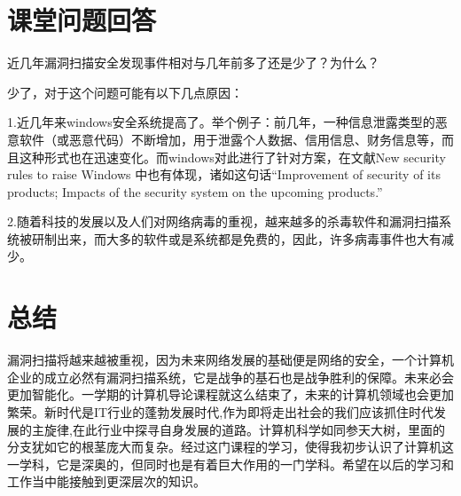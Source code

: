\documentclass{article}
\begin{document}
\section{课堂问题回答}
近几年漏洞扫描安全发现事件相对与几年前多了还是少了？为什么？

少了，对于这个问题可能有以下几点原因：

1.近几年来windows安全系统提高了。举个例子：前几年，一种信息泄露类型的恶意软件（或恶意代码）不断增加，用于泄露个人数据、信用信息、财务信息等，而且这种形式也在迅速变化。而windows对此进行了针对方案，在文献New security rules to raise Windows  \citep{Fisher2003New}中也有体现，诸如这句话“Improvement of security of its products; Impacts of the security system on the upcoming products.”

2.随着科技的发展以及人们对网络病毒的重视，越来越多的杀毒软件和漏洞扫描系统被研制出来，而大多的软件或是系统都是免费的，因此，许多病毒事件也大有减少。
\section{总结}
漏洞扫描将越来越被重视，因为未来网络发展的基础便是网络的安全，一个计算机企业的成立必然有漏洞扫描系统，它是战争的基石也是战争胜利的保障。未来必会更加智能化。一学期的计算机导论课程就这么结束了，未来的计算机领域也会更加繁荣。新时代是IT行业的蓬勃发展时代,作为即将走出社会的我们应该抓住时代发展的主旋律,在此行业中探寻自身发展的道路。计算机科学如同参天大树，里面的分支犹如它的根茎庞大而复杂。经过这门课程的学习，使得我初步认识了计算机这一学科，它是深奥的，但同时也是有着巨大作用的一门学科。希望在以后的学习和工作当中能接触到更深层次的知识。
\par

\newpage
\end{document}

